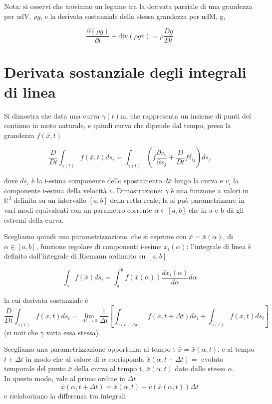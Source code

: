 \documentclass[a4paper,11pt]{report}
\newcommand{\x}{\bar{x}}
\newcommand{\vel}{\bar{v}}
\begin{document}
		Nota: si osservi che troviamo un legame tra la derivata parziale di una grandezza per udV, $\rho g$, e la derivata sostanziale della stessa grandezza per udM, g,
		
		\begin{equation}
			\dfrac{\partial(\rho g)}{\partial t} + \mathrm{ div}\left(\rho g \vel\right) = \rho \dfrac{Dg}{Dt}
		\end{equation}
		
	\section{Derivata sostanziale degli integrali di linea}
		
		Si dimostra che data una curva $\gamma(t)$m, che rappresenta un insieme di punti del continuo in moto naturale, e quindi curva che dipende dal tempo, presa la grandezza $f(\x,t)$
		
		\begin{equation}
			\dfrac{D}{Dt}\int_{\gamma(t)} f(\x,t) ds_i = \int_{\gamma(t)} \left(f\dfrac{\partial v_i}{\partial x_j} + \dfrac{D}{Dt}f\delta_{ij}\right)ds_j
		\end{equation}
		
		dove $ds_i$ è la i-esima componente dello spostamento $d\x$ lungo la curva e $v_i$ la componente i-esima della velocità $\vel$.
		Dimostrazione: $\gamma$ è una funzione a valori in $\mathbb{R}^3$ definita su un intervallo $\left[a,b\right]$ della retta reale; la si può parametrizzare in vari modi equivalenti con un parametro corrente $\alpha \in \left[a,b\right]$ che in a e b dà gli estremi della curva.
		
		Scegliamo quindi una parametrizzazione, che si esprime con $\x=\x(\alpha)$, di $\alpha \in \left[a,b\right]$, funzione regolare di componenti i-esime $x_i(\alpha)$; l'integrale di linea è definito dall'integrale di Riemann ordinario su $\left[a,b\right]$
		
		$$
		\int_{\gamma} f(\x)ds_i = \int_{a}^{b} f\left(\x(\alpha)\right)\dfrac{dx_i(\alpha)}{d\alpha}d\alpha
		$$
		
		la cui derivata sostanziale è
		$$
		\dfrac{D}{Dt}\int_{\gamma(t)} f(\x,t)ds_i =
		\lim_{\Delta t\to 0} \dfrac{1}{\Delta t}\left[\int_{\gamma(t+\Delta t)} f(\x,t+\Delta t)ds_i + \int_{\gamma(t)}f(\x,t)ds_i\right]
		$$
		(si noti che $\gamma$ varia essa stessa).
		
		Scegliamo una parametrizzazione opportuna: al tempo t $\x=\x(\alpha,t)$, e al tempo $t+\Delta t$ in modo che al valore di $\alpha$ corrisponda $\x(\alpha,t+\Delta t)=$ evoluto temporale del punto $\x$ della curva al tempo t, $\x(\alpha,t)$ dato dallo stesso $\alpha$.\\
		In questo modo, vale al primo ordine in $\Delta t$
		$$
		\x(\alpha,t+\Delta t) = \x(\alpha,t) + \vel(\x(\alpha,t))\Delta t
		$$
		e rielaboriamo la differenza tra integrali
		
\end{document}
